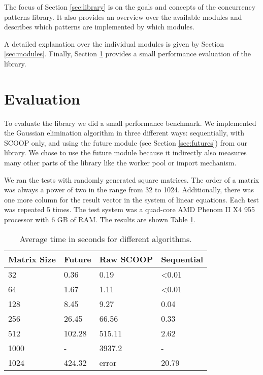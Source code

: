 \documentclass[a4paper,10pt,titlepage]{article}
\begin{document}
The focus of Section \ref{sec:library} is on the goals and concepts of the concurrency patterns library.
It also provides an overview over the available modules and describes which patterns are implemented by which modules.

A detailed explanation over the individual modules is given by Section \ref{sec:modules}.
Finally, Section \ref{sec:evaluation} provides a small performance evaluation of the library.






\section{Evaluation}
\label {sec:evaluation}

To evaluate the library we did a small performance benchmark.
We implemented the Gaussian elimination algorithm in three different ways: sequentially, with SCOOP only, and using the future module (see Section \ref{sec:futures}) from our library.
We chose to use the future module because it indirectly also measures many other parts of the library like the worker pool or import mechanism.

We ran the tests with randomly generated square matrices.
The order of a matrix was always a power of two in the range from 32 to 1024.
Additionally, there was one more column for the result vector in the system of linear equations.
Each test was repeated 5 times.
The test system was a quad-core AMD Phenom II X4 955 processor with 6 GB of RAM.
The results are shown Table \ref{table:perf-results}.

\begin{table} [h]
\centering
\begin{tabular}{|l|l l l|} 
\hline
Matrix Size & Future & Raw SCOOP & Sequential\\
\hline
32 & 0.36 & 0.19 &  \textless 0.01\\
64 & 1.67 & 1.11 & \textless 0.01\\
128 & 8.45 & 9.27 & 0.04\\
256 & 26.45 & 66.56 & 0.33\\
512 & 102.28 & 515.11 & 2.62\\
1000 & - &  3937.2 & - \\
1024 & 424.32 & error & 20.79 \\
\hline
\end{tabular}
\caption{Average time in seconds for different algorithms.}
\label{table:perf-results}
\end{table}
\end{document}
